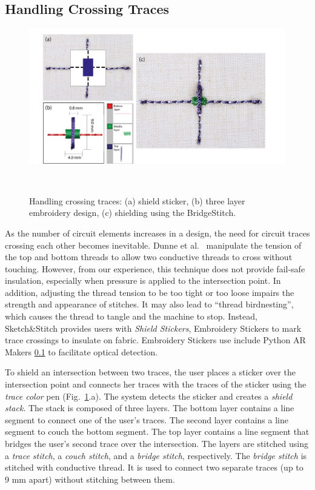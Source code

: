 \documentclass[header.tex]{subfiles}
\begin{document}
\subsection{Handling Crossing Traces}
\begin{figure}
\centering
  \includegraphics[width=1\columnwidth]{figures/BridgeStitch}
  \caption{Handling crossing traces: (a) shield sticker, (b) three layer embroidery design, (c) shielding using the BridgeStitch.}~\label{fig:BridgeStitch}
  \vspace{-1.5em}
\end{figure}

As the number of circuit elements increases in a design, the need for circuit traces crossing each other becomes inevitable. Dunne et al.\ \cite{Dunne:2012:MEC:2370216.2370348} manipulate the tension of the top and bottom threads to allow two conductive threads to cross without touching. However, from our experience, this technique does not provide fail-safe insulation, especially when pressure is applied to the intersection point. In addition, adjusting the thread tension to be too tight or too loose impairs the strength and appearance of stitches. It may also lead to ``thread birdnesting'', which causes the thread to tangle and the machine to stop.  
Instead, Sketch\&Stitch provides users with \textit{Shield Stickers}, Embroidery Stickers to mark trace crossings to insulate on fabric. Embroidery Stickers use include Python AR Makers \ref{} to facilitate optical detection.


To shield an intersection between two traces, the user places a sticker over the intersection point and connects her traces with the traces of the sticker using the \textit{trace color} pen (Fig.\ \ref{fig:BridgeStitch}.a). 
The system detects the sticker and creates a \textit{shield stack}. The stack is composed of three layers. The bottom layer contains a line segment to connect one of the user's traces. The second layer contains a line segment to couch the bottom segment. The top layer contains a line segment that bridges the user's second trace over the intersection. The layers are stitched using a \textit{trace stitch}, a \textit{couch stitch}, and a \textit{bridge stitch}, respectively. The \textit{bridge stitch} is stitched with conductive thread. It is used to connect two separate traces (up to 9 mm apart) without stitching between them.
\end{document}
